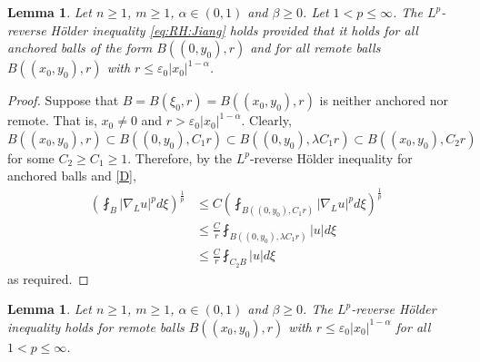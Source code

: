 \documentclass[12pt]{amsart}
\newtheorem{lemma}[theorem]{Lemma}
\begin{document}
\begin{lemma}\label{reduce_RH}
Let $n\ge 1$, $m\ge 1$, $\alpha\in (0,1)$ and $\beta \ge 0$. Let $1<p\le \infty$. The $L^p$-reverse H\"older inequality \eqref{eq:RH:Jiang} holds provided that it holds for all anchored balls of the form $B((0,y_0), r)$ and for all remote balls $B((x_0,y_0), r)$ with $r\le \varepsilon_0 |x_0|^{1-\alpha}$.
\end{lemma}

\begin{proof}
Suppose that $B=B(\xi_0,r) = B((x_0,y_0), r)$ is neither anchored nor remote. That is, $x_0 \ne 0$ and $r>\varepsilon_0 |x_0|^{1-\alpha}$. Clearly, $B((x_0,y_0), r) \subset B((0,y_0), C_1 r)\subset B((0,y_0), \lambda C_1 r) \subset B((x_0,y_0), C_2 r)$ for some $C_2 \ge C_1 \ge 1$. Therefore, by the $L^p$-reverse H\"older inequality for anchored balls and \eqref{D},
\begin{align*}
    \left( \fint_B |\nabla_L u|^p d\xi \right)^{\frac{1}{p}}
    &\le C \left( \fint_{B((0,y_0), C_1 r)} |\nabla_L u|^p d\xi \right)^{\frac{1}{p}} \\
    &\le \frac{C}{r} \fint_{B((0,y_0), \lambda C_1 r)} |u| d\xi \\
    &\le \frac{C}{r} \fint_{C_2 B} |u| d\xi
\end{align*}
as required.
\end{proof}

\begin{lemma}\label{RH_remote}
Let $n\ge 1$, $m\ge 1$, $\alpha\in (0,1)$ and $\beta \ge 0$. The $L^p$-reverse H\"older inequality holds for remote balls $B((x_0,y_0), r)$ with $r\le \varepsilon_0 |x_0|^{1-\alpha}$ for all $1<p\le \infty$.
\end{lemma}
\end{document}
